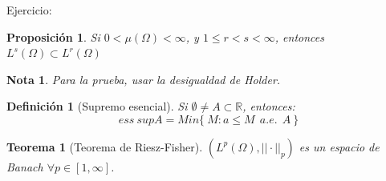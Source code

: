 \documentclass[11pt, a4paper]{article}
\newif\IfInSansMode
\newcommand{\R}{\mathbb{R}} \newcommand{\N}{\mathbb{N}}
\theoremstyle{theorem-style}
\newtheorem{nth}{Teorema}[section]
\newtheorem{nprop}{Proposición}[section]
\theoremstyle{definition-style}
\newtheorem{ndef}{Definición}[section]
\theoremstyle{remark-style}
\newtheorem*{nota}{Nota}
\theoremstyle{example-style}
\begin{document}
Ejercicio:
\begin{nprop}
  Si $0 < \mu(\Omega) < \infty$, y $1\leq r < s < \infty $, entonces $L^s(\Omega) \subset L^r(\Omega)$
\end{nprop}
\begin{nota}
  Para la prueba, usar la desigualdad de Holder.
\end{nota}

\begin{ndef}[Supremo esencial]
  Si $\emptyset \ne A \subset \R$, entonces:
  \[
    ess \ sup A = Min\{ \ M : a \leq M \ \ a.e. \ \ A \ \}
  \]
\end{ndef}

\begin{nth}[Teorema de Riesz-Fisher]
  $( L^p(\Omega), || \cdot ||_p)$ es un espacio de Banach $\forall p \in [1,\infty]$.
\end{nth}
\end{document}
